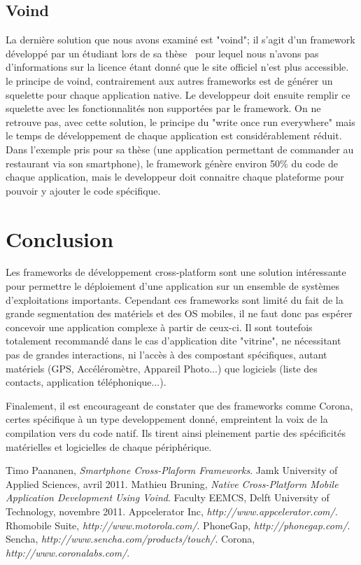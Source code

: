 \documentclass{article}
\begin{document}
\subsection{Voind}
La dernière solution que nous avons examiné est "voind"; il s'agit d'un framework développé par un étudiant lors de sa thèse~\cite{bruning11} pour lequel nous n'avons pas d'informations sur la licence étant donné que le site officiel n'est plus accessible.
le principe de voind, contrairement aux autres frameworks est de générer un squelette pour chaque application native. Le developpeur doit ensuite remplir ce squelette avec les  fonctionnalités non supportées par le framework. On ne retrouve pas, avec cette solution, le principe du "write once run everywhere" mais le temps de développement de chaque application est considérablement réduit. Dans l'exemple pris pour sa thèse (une application permettant de commander au restaurant via son smartphone), le framework génère environ 50\% du code de chaque application, mais le developpeur doit connaitre chaque plateforme pour pouvoir y ajouter le code spécifique.

\section{Conclusion}
Les frameworks de développement cross-platform sont une solution intéressante pour permettre le déploiement d'une application sur un ensemble de systèmes d'exploitations importants. Cependant ces frameworks sont limité du fait de la grande segmentation des matériels et des OS mobiles, il ne faut donc pas espérer concevoir une application complexe à partir de ceux-ci. Il sont toutefois totalement recommandé dans le cas d'application dite "vitrine", ne nécessitant pas de grandes interactions, ni l'accès à des compostant spécifiques, autant matériels (GPS, Accéléromètre, Appareil Photo...) que logiciels (liste des contacts, application téléphonique...).

Finalement, il est encourageant de constater que des frameworks comme Corona, certes spécifique à un type developpement donné, empreintent la voix de la compilation vers du code natif. Ils tirent ainsi pleinement partie des spécificités matérielles et logicielles de chaque périphérique.


\newpage
\begin{thebibliography}{9}
          Timo Paananen,
          \emph{Smartphone Cross-Plaform Frameworks}.
          Jamk University of Applied Sciences,
          avril 2011.
          Mathieu Bruning,
          \emph{Native Cross-Platform Mobile Application Development Using Voind}.
          Faculty EEMCS, Delft University of Technology,
          novembre 2011.
          Appcelerator Inc,
          \emph{http://www.appcelerator.com/}.
          Rhomobile Suite,
          \emph{http://www.motorola.com/}.
          PhoneGap,
          \emph{http://phonegap.com/}.
          Sencha,
          \emph{http://www.sencha.com/products/touch/}.
          Corona,
          \emph{http://www.coronalabs.com/}.
\end{thebibliography}
\end{document}
